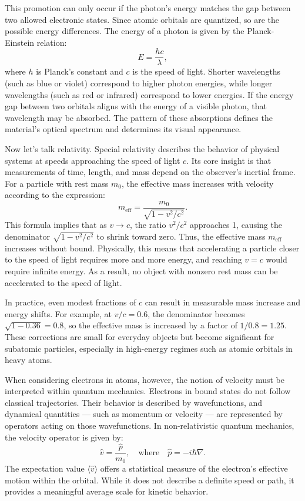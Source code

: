 This promotion can only occur if the photon's energy matches the gap between two allowed electronic states. Since atomic orbitals are quantized, so are the possible energy differences. The energy of a photon is given by the Planck-Einstein relation:
\[
E = \frac{hc}{\lambda},
\]
where \( h \) is Planck’s constant and \( c \) is the speed of light. Shorter wavelengths (such as blue or violet) correspond to higher photon energies, while longer wavelengths (such as red or infrared) correspond to lower energies. If the energy gap between two orbitals aligns with the energy of a visible photon, that wavelength may be absorbed. The pattern of these absorptions defines the material’s optical spectrum and determines its visual appearance.

Now let's talk relativity. Special relativity describes the behavior of physical systems at speeds approaching the speed of light \( c \). Its core insight is that measurements of time, length, and mass depend on the observer’s inertial frame. For a particle with rest mass \( m_0 \), the effective mass increases with velocity according to the expression:
\[
m_\text{eff} = \frac{m_0}{\sqrt{1 - v^2/c^2}}.
\]
This formula implies that as \( v \to c \), the ratio \( v^2/c^2 \) approaches 1, causing the denominator \( \sqrt{1 - v^2/c^2} \) to shrink toward zero. Thus, the effective mass \( m_\text{eff} \) increases without bound. Physically, this means that accelerating a particle closer to the speed of light requires more and more energy, and reaching \( v = c \) would require infinite energy. As a result, no object with nonzero rest mass can be accelerated to the speed of light.

In practice, even modest fractions of \( c \) can result in measurable mass increase and energy shifts. For example, at \( v/c = 0.6 \), the denominator becomes \( \sqrt{1 - 0.36} = 0.8 \), so the effective mass is increased by a factor of \( 1/0.8 = 1.25 \). These corrections are small for everyday objects but become significant for subatomic particles, especially in high-energy regimes such as atomic orbitals in heavy atoms.

When considering electrons in atoms, however, the notion of velocity must be interpreted within quantum mechanics. Electrons in bound states do not follow classical trajectories. Their behavior is described by wavefunctions, and dynamical quantities — such as momentum or velocity — are represented by operators acting on those wavefunctions. In non-relativistic quantum mechanics, the velocity operator is given by:
\[
\hat{v} = \frac{\hat{p}}{m_0}, \quad \text{where} \quad \hat{p} = -i\hbar \nabla.
\]
The expectation value \( \langle \hat{v} \rangle \) offers a statistical measure of the electron’s effective motion within the orbital. While it does not describe a definite speed or path, it provides a meaningful average scale for kinetic behavior.

